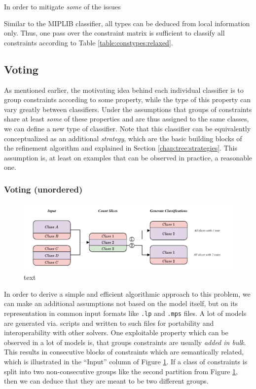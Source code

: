 			In order to mitigate \textit{some} of the issues

			Similar to the MIPLIB classifier, all types can be deduced from local information only. Thus, one pass over the constraint matrix is sufficient to classify all constraints according to Table \ref{table:constypes:relaxed}. 

			\clearpage

		\subsection{Voting}
		\label{chap:tree:classifiers:voting}

			As mentioned earlier, the motivating idea behind each individual classifier is to group constraints according to some property, while the type of this property can vary greatly between classifiers.
			Under the assumptions that groups of constraints share at least \textit{some} of these properties and are thus assigned to the same classes, we can define a new type of classifier.
			Note that this classifier can be equivalently conceptualized as an additional \textit{strategy}, which are the basic building blocks of the refinement algorithm and explained in Section \ref{chap:tree:strategies}.
			This assumption is, at least on examples that can be observed in practice, a reasonable one.

			\subsubsection{Voting (unordered)}

				\begin{figure}[ht!]
					\centering
					\includegraphics[scale=1.05]{Bilder/DrawIO/strat_ordered_voting_pdf}
					\caption{text}
					\label{fig:tree:classifiers:ovoting}
				\end{figure}

				In order to derive a simple and efficient algorithmic approach to this problem, we can make an additional assumptions not based on the model itself, but on its representation in common input formats like \lstinline|.lp| and \lstinline|.mps| files.
				A lot of models are generated via. scripts and written to such files for portability and interoperability with other solvers.
				One exploitable property which can be observed in a lot of models is, that groups constraints are usually \textit{added in bulk}.
				This results in consecutive blocks of constraints which are semantically related, which is illustrated in the \enquote{Input} column of Figure \ref{fig:tree:classifiers:ovoting}.
				If a class of constraints is split into two non-consecutive groups like the second partition from Figure \ref{fig:tree:classifiers:ovoting}, then we can deduce that they are meant to be two different groups.

